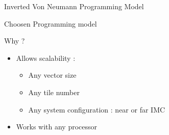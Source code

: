 \begin{Frame}{Inverted Von Neumann Programming Model}
  \begin{block}{Choosen Programming model}
    \hfill{}     
    \end{block}
    \begin{block}{Why ?}
      \begin{itemize}
      \item Allows scalability :
        \begin{itemize}
        \item Any vector size
        \item Any tile number
        \item Any system configuration : near or far IMC
        \end{itemize}
        \item Works with any processor
      \end{itemize}
    \end{block}
\end{Frame}
